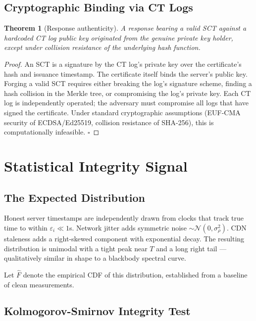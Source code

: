 \documentclass[11pt,twocolumn]{article}
\newtheorem{theorem}{Theorem}
\begin{document}
\subsection{Cryptographic Binding via CT Logs}

\begin{theorem}[Response authenticity]
  A response bearing a valid SCT against a hardcoded CT log public key
  originated from the genuine private key holder, except under collision
  resistance of the underlying hash function.
\end{theorem}

\begin{proof}
  An SCT is a signature by the CT log's private key over the certificate's
  hash and issuance timestamp.  The certificate itself binds the server's
  public key.  Forging a valid SCT requires either breaking the log's
  signature scheme, finding a hash collision in the Merkle tree, or
  compromising the log's private key.  Each CT log is independently operated;
  the adversary must compromise all logs that have signed the certificate.
  Under standard cryptographic assumptions (EUF-CMA security of ECDSA/Ed25519,
  collision resistance of SHA-256), this is computationally infeasible.
  $\square$
\end{proof}

\section{Statistical Integrity Signal}

\subsection{The Expected Distribution}

Honest server timestamps are independently drawn from clocks that track true
time to within $\varepsilon_i \ll 1$s.  Network jitter adds symmetric noise
$\sim \mathcal{N}(0, \sigma^2_{\rho})$.  CDN staleness adds a right-skewed
component with exponential decay.  The resulting distribution is unimodal with
a tight peak near $T$ and a long right tail — qualitatively similar in shape
to a blackbody spectral curve.

Let $\hat{F}$ denote the empirical CDF of this distribution, established from
a baseline of clean measurements.

\subsection{Kolmogorov-Smirnov Integrity Test}
\end{document}
